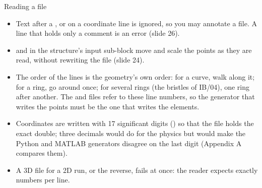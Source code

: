 \documentclass[aspectratio=169,11pt]{beamer}
\begin{document}
\begin{frame}{Reading a  file}
\begin{itemize}
  \item Text after a \code{\#}, \code{\%} or \code{!} on a coordinate line is ignored, so you may annotate a  file. A line that holds only a comment is an error (slide 26).
  \item {} and  in the structure's input sub-block move and scale the points as they are read, without rewriting the file (slide 24).
  \item The order of the lines is the geometry's own order: for a curve, walk along it; for a ring, go around once; for several rings (the bristles of IB/04), one ring after another. The  and  files refer to these line numbers, so the generator that writes the points must be the one that writes the elements.
  \item Coordinates are written with 17 significant digits () so that the file holds the exact double; three decimals would do for the physics but would make the Python and MATLAB generators disagree on the last digit (Appendix A compares them).
  \item A 3D  file for a 2D run, or the reverse, fails at once: the reader expects exactly  numbers per line.
\end{itemize}
\end{frame}
\end{document}
